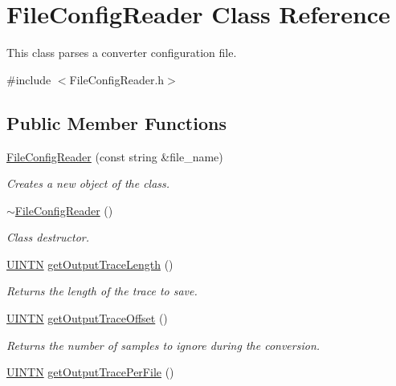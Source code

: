 \hypertarget{classFileConfigReader}{
\section{FileConfigReader Class Reference}
\label{classFileConfigReader}
}


This class parses a converter configuration file.  




{\ttfamily \#include $<$FileConfigReader.h$>$}

\subsection*{Public Member Functions}
\begin{DoxyCompactItemize}
\item 
\hyperlink{classFileConfigReader_ae83fe38cc761e9a0a7b95ae1ac0ecc43}{FileConfigReader} (const string \&file\_\-name)
\begin{DoxyCompactList}\small\item\em Creates a new object of the class. \end{DoxyCompactList}\item 
\hyperlink{classFileConfigReader_af4d6d93dfb299f95451d674a96963f37}{$\sim$FileConfigReader} ()
\begin{DoxyCompactList}\small\item\em Class destructor. \end{DoxyCompactList}\item 
\hyperlink{common_8h_a271e567655d46ec23cdcca42c1deab91}{UINTN} \hyperlink{classFileConfigReader_aac2a88c0bcab29cf36fe5bb43b5e373b}{getOutputTraceLength} ()
\begin{DoxyCompactList}\small\item\em Returns the length of the trace to save. \end{DoxyCompactList}\item 
\hyperlink{common_8h_a271e567655d46ec23cdcca42c1deab91}{UINTN} \hyperlink{classFileConfigReader_a563326884bf6888eb8986a05c29db8d4}{getOutputTraceOffset} ()
\begin{DoxyCompactList}\small\item\em Returns the number of samples to ignore during the conversion. \end{DoxyCompactList}\item 
\hyperlink{common_8h_a271e567655d46ec23cdcca42c1deab91}{UINTN} \hyperlink{classFileConfigReader_a86531cab49815921e99c1c10dc42961d}{getOutputTracePerFile} ()

\end{DoxyCompactItemize}
